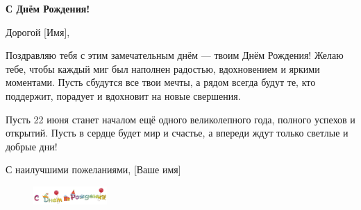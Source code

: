 \documentclass{article}
\begin{document}
\begin{center}
    \textbf{\Large С Днём Рождения!}
\end{center}

Дорогой [Имя],

Поздравляю тебя с этим замечательным днём — твоим Днём Рождения! Желаю тебе, чтобы каждый миг был наполнен радостью, вдохновением и яркими моментами. Пусть сбудутся все твои мечты, а рядом всегда будут те, кто поддержит, порадует и вдохновит на новые свершения.

Пусть 22 июня станет началом ещё одного великолепного года, полного успехов и открытий. Пусть в сердце будет мир и счастье, а впереди ждут только светлые и добрые дни!

С наилучшими пожеланиями,  
[Ваше имя]

\begin{figure}
  \centering
  \includegraphics[width=0.25\textwidth]{happy_birthday.png}
\end{figure}
\end{document}

